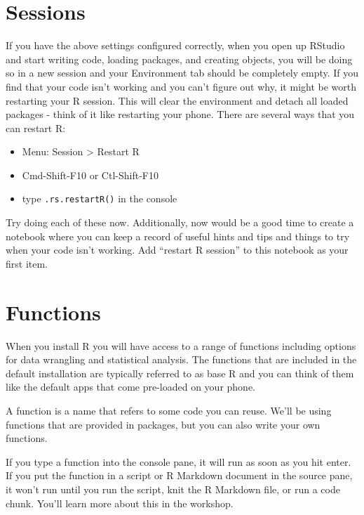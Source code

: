 \documentclass[
  oneside]{book}
\providecommand{\tightlist}{%
  \setlength{\itemsep}{0pt}\setlength{\parskip}{0pt}}
\begin{document}
\section{Sessions}\label{intro-sessions}

If you have the above settings configured correctly, when you open up RStudio and start writing code, loading packages, and creating objects, you will be doing so in a new session and your Environment tab should be completely empty. If you find that your code isn't working and you can't figure out why, it might be worth restarting your R session. This will clear the environment and detach all loaded packages - think of it like restarting your phone. There are several ways that you can restart R:

\begin{itemize}
\tightlist
\item
  Menu: Session \textgreater{} Restart R
\item
  {Cmd-Shift-F10} or {Ctl-Shift-F10}
\item
  type \texttt{.rs.restartR()} in the console
\end{itemize}

Try doing each of these now. Additionally, now would be a good time to create a notebook where you can keep a record of useful hints and tips and things to try when your code isn't working. Add ``restart R session'' to this notebook as your first item.

\section{Functions}\label{functions}

When you install R you will have access to a range of functions{} including options for data wrangling{} and statistical analysis. The functions that are included in the default installation are typically referred to as base R{} and you can think of them like the default apps that come pre-loaded on your phone.

A function{} is a name that refers to some code you can reuse. We'll be using functions that are provided in packages, but you can also write your own functions.

If you type a function into the console pane, it will run as soon as you hit enter. If you put the function in a script{} or R Markdown{} document in the source pane{}, it won't run until you run the script, knit{} the R Markdown file, or run a code chunk{}. You'll learn more about this in the workshop.
\end{document}
